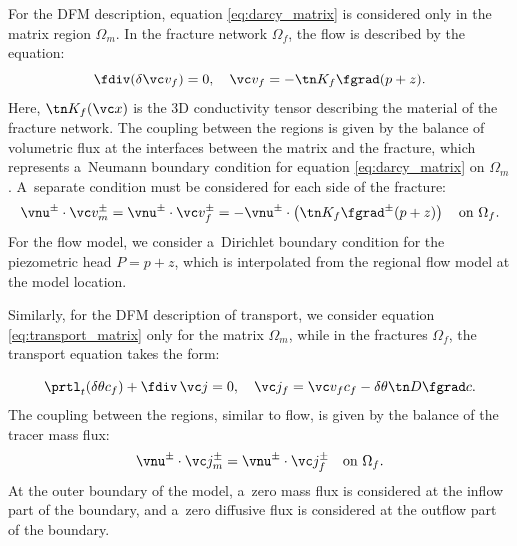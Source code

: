 For the DFM description, equation \eqref{eq:darcy_matrix} is considered only in the matrix region $\Omega_m$. In the fracture network $\Omega_f$, the flow is described by the equation:
\begin{equation}
    \label{eq:darcy_fracture}
    \fdiv (\delta \vc v_f) = 0, \quad \vc v_f = -\tn K_f \fgrad (p + z).
\end{equation}
Here, $\tn K_f(\vc x)$ is the 3D conductivity tensor describing the material of the fracture network. The coupling between the regions is given by the balance of volumetric flux at the interfaces between the matrix and the fracture, which represents a~Neumann boundary condition for equation \eqref{eq:darcy_matrix} on $\Omega_m$. A~separate condition must be considered for each side of the fracture:
\begin{equation}
    \vnu^{\pm} \cdot \vc v_m^\pm = \vnu^{\pm} \cdot \vc v_f^\pm =  
    -\vnu^\pm \cdot \left(\tn K_f \fgrad^\pm (p + z)\right)
    \quad \text{on }\Omega_f.
\end{equation}
For the flow model, we consider a~Dirichlet boundary condition for the piezometric head $P = p + z$, which is interpolated from the regional flow model at the model location.

Similarly, for the DFM description of transport, we consider 
equation \eqref{eq:transport_matrix} only for the matrix $\Omega_m$,
while in the fractures $\Omega_f$, the transport equation takes the form:

\begin{equation}
   \label{eq:transport_fr}    
   \prtl_t (\delta\theta c_f) + \fdiv \,\vc j = 0, \quad  
   \vc j_f = \vc v_f c_f - \delta \theta \tn D \fgrad c.
\end{equation}
The coupling between the regions, similar to flow, is given by the balance of the tracer mass flux:
\begin{equation}
    \vnu^{\pm} \cdot \vc j_m^\pm  = \vnu^{\pm} \cdot \vc j_f^\pm  \quad \text{on }\Omega_f.
\end{equation}
At the outer boundary of the model, a~zero mass flux is considered at the inflow part of the boundary, and a~zero diffusive flux is considered at the outflow part of the boundary.

\def\rmin{\underline r}
\def\rmax{\overline r}
